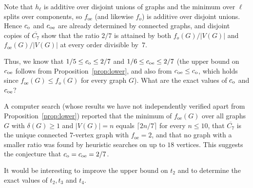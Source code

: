 \documentclass[11pt]{article}
\newcommand{\VV}[1]{{#1}}
\theoremstyle{definition}
\theoremstyle{remark}
\newcommand{\foe}{f_{\mathrm{oe}}}
\newcommand{\fo}{f_o}
\newcommand{\1}{\mathbf{1}}
\begin{document}
Note that $h_\ell$ is additive over disjoint unions of graphs and the minimum over $\ell$ splits over components, so $\foe$ (and likewise $\fo$) is additive over disjoint unions. Hence $c_{\rm o}$ and $c_{\rm oe}$ are already determined by connected graphs, and disjoint copies of $\overline{C_7}$ show that the ratio $2/7$ is attained by both $\fo(G)/|V(G)|$ and $\foe(G)/|V(G)|$ at every order divisible by~$7$.



Thus, we know that $1/5\le c_{\rm o}\le 2/7$ and $1/6\le \VV{c_{\rm oe}}\le 2/7$ \VV{(the upper bound on $c_{\rm oe}$ follows from Proposition~\ref{prop:lower}, and also from $c_{\rm oe}\le c_{\rm o}$, which holds since $\foe(G)\le \fo(G)$ for every graph $G$)}. What are the exact values of $c_{\rm o}$ and $c_{\rm oe}$?



A computer search (whose results we have not independently verified apart from Proposition~\ref{prop:lower}) reported that the minimum of $\foe(G)$ over all graphs $G$ with $\delta(G)\ge 1$ and $|V(G)|=n$ equals $\lceil 2n/7\rceil$ for every $n\le 10$, that $\overline{C_7}$ is the unique connected $7$-vertex graph with $\foe=2$, and that no graph with a smaller ratio was found by heuristic searches on up to $18$ vertices. This suggests the conjecture that $c_{\rm o}=c_{\rm oe}=2/7$.


\vspace{1mm}

It would be interesting to \VV{improve} the upper bound on $t_2$ and to determine the exact values of $t_2, t_3$ and $t_4$.
 
	
	
\end{document}
